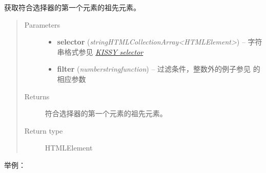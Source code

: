 \documentclass[letterpaper,10pt,english]{sphinxmanual}
\begin{document}
\begin{fulllineitems}
\label{api/core/dom/parent:DOM.parent}
获取符合选择器的第一个元素的祖先元素。
\begin{quote}\begin{description}
\item[{Parameters}] \leavevmode\begin{itemize}
\item {}
\textbf{selector} (\emph{string\textbar{}HTMLCollection\textbar{}Array\textless{}HTMLElement\textgreater{}}) -- 字符串格式参见 {\hyperref[api/core/dom/selector:dom-selector]{\emph{KISSY selector}}}

\item {}
\textbf{filter} (\emph{number\textbar{}string\textbar{}function}) -- 过滤条件，整数外的例子参见 {\hyperref[api/core/dom/filter:DOM.filter]{}} 的相应参数

\end{itemize}

\item[{Returns}] \leavevmode
符合选择器的第一个元素的祖先元素。

\item[{Return type}] \leavevmode
HTMLElement

\end{description}\end{quote}

\end{fulllineitems}


 举例：
\end{document}
